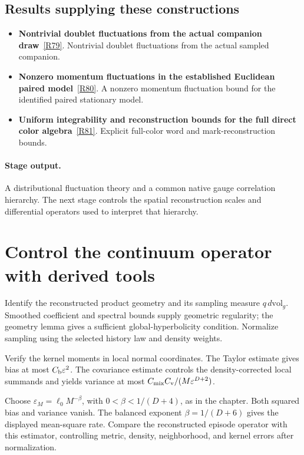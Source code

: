 \documentclass[11pt,a4paper]{article}
\begin{document}
\subsection*{Results supplying these constructions}
\begin{itemize}
\item \textbf{Nontrivial doublet fluctuations from the actual companion draw}~\hyperref[src:thm-sm-native-doublet-fluctuations]{[R79]}. Nontrivial doublet fluctuations from the actual sampled companion.
\item \textbf{Nonzero momentum fluctuations in the established Euclidean paired model}~\hyperref[src:cor-ym-paired-momentum-fluctuations]{[R80]}. A nonzero momentum fluctuation bound for the identified paired stationary model.
\item \textbf{Uniform integrability and reconstruction bounds for the full direct color algebra}~\hyperref[src:lem-ym-physical-gauge-word-uniform-integrability]{[R81]}. Explicit full-color word and mark-reconstruction bounds.
\end{itemize}
\paragraph{Stage output.} A distributional fluctuation theory and a common native gauge correlation hierarchy. The next stage controls the spatial reconstruction scales and differential operators used to interpret that hierarchy.

\section{Control the continuum operator with derived tools}
\label{stage:15}
Identify the reconstructed product geometry and its sampling measure \(q\,d\mathrm{vol}_g\). Smoothed coefficient and spectral bounds supply geometric regularity; the geometry lemma gives a sufficient global-hyperbolicity condition. Normalize sampling using the selected history law and density weights.

Verify the kernel moments in local normal coordinates. The Taylor estimate gives bias at most \(C_{\rm b}\varepsilon^2\). The covariance estimate controls the density-corrected local summands and yields variance at most \(C_{\rm mix}C_{\rm v}/(M\varepsilon^{D+2})\).

Choose \(\varepsilon_M=\ell_0M^{-\beta}\), with \(0<\beta<1/(D+4)\), as in the chapter. Both squared bias and variance vanish. The balanced exponent \(\beta=1/(D+6)\) gives the displayed mean-square rate. Compare the reconstructed episode operator with this estimator, controlling metric, density, neighborhood, and kernel errors after normalization.
\end{document}
